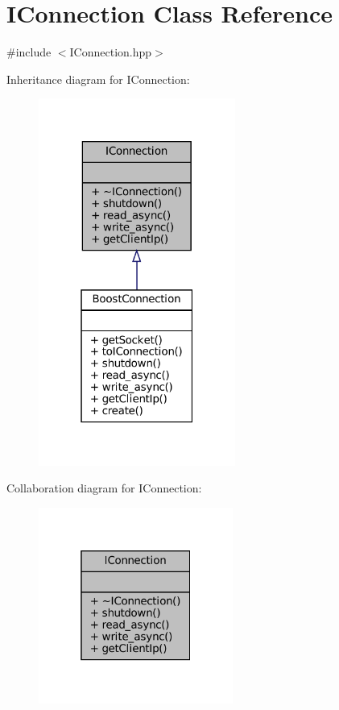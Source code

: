 \hypertarget{classIConnection}{}\section{I\+Connection Class Reference}
\label{classIConnection}


{\ttfamily \#include $<$I\+Connection.\+hpp$>$}



Inheritance diagram for I\+Connection\+:
\nopagebreak
\begin{figure}[H]
\begin{center}
\leavevmode
\includegraphics[width=183pt]{classIConnection__inherit__graph}
\end{center}
\end{figure}


Collaboration diagram for I\+Connection\+:
\nopagebreak
\begin{figure}[H]
\begin{center}
\leavevmode
\includegraphics[width=181pt]{classIConnection__coll__graph}
\end{center}
\end{figure}

